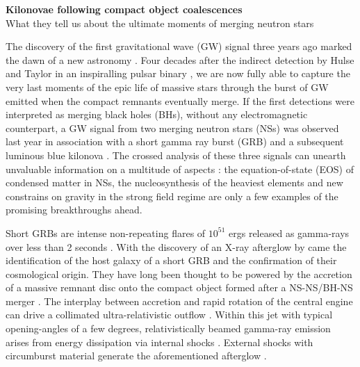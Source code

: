 \documentclass[12pt,onecolumn]{article}
\title{	
\vspace*{-2.5cm}
}
\author{\tiny} %
\date{\tiny }%
\makeatletter
\newcommand{\gw}{GW\xspace}
\newcommand{\grb}{GRB\xspace}
\newcommand{\grbs}{GRBs\xspace}
\newcommand{\eos}{EOS\xspace}
\newcommand*{\ns}{NS\@\xspace}
\newcommand*{\nss}{NSs\@\xspace}
\newcommand*{\bh}{BH\@\xspace}
\newcommand*{\bhs}{BHs\@\xspace}
\makeatother
\begin{document}


\renewcommand{\headrulewidth}{1pt}
\pagestyle{fancy}
\fancyhf{}
\rfoot{\thepage / \pageref{LastPage}}

\vspace*{-1.2cm}
\begin{center}
\Large \textbf{Kilonovae following compact object coalescences}\\
\large What they tell us about the ultimate moments of merging neutron stars  
\end{center}
\normalfont

The discovery of the first gravitational wave (\gw) signal three years ago marked the dawn of a new astronomy \citep{Abbott2016}. Four decades after the indirect detection by Hulse and Taylor in an inspiralling pulsar binary \citep{Hulse1974}, we are now fully able to capture the very last moments of the epic life of massive stars through the burst of \gw emitted when the compact remnants eventually merge. If the first detections were interpreted as merging black holes (\bhs), without any electromagnetic counterpart, a \gw signal from two merging neutron stars (\nss) was observed last year in association with a short gamma ray burst (\grb) and a subsequent luminous blue kilonova \citep{TheLIGOScientificCollaboration2017}. The crossed analysis of these three signals can unearth unvaluable information on a multitude of aspects : the equation-of-state (\eos) of condensed matter in \nss, the nucleosynthesis of the heaviest elements and new constrains on gravity in the strong field regime are only a few examples of the promising breakthroughs ahead.

Short \grbs are intense non-repeating flares of $10^{51}$ ergs released as gamma-rays over less than 2 seconds \citep{Berger2014}. With the discovery of an X-ray afterglow by \citet{Gehrels2005} came the identification of the host galaxy of a short \grb and the confirmation of their cosmological origin. They have long been thought to be powered by the accretion of a massive remnant disc onto the compact object formed after a \ns-\ns/\bh-\ns merger \citep{Eichler1989}. The interplay between accretion and rapid rotation of the central engine can drive a collimated ultra-relativistic outflow \citep{Piran2005}. Within this jet with typical opening-angles of a few degrees, relativistically beamed gamma-ray emission arises from energy dissipation via internal shocks \citep{Rees1992}. External shocks with circumburst material generate the aforementioned afterglow \citep{Kumar2015}.
\end{document}
